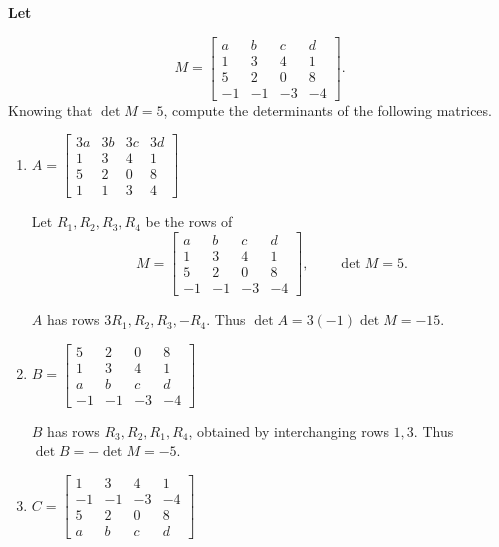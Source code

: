 \providecommand{\rank}{\operatorname{r}}
\providecommand{\RR}{\mathbb R}
\providecommand{\CC}{\mathbb C}
\providecommand{\KK}{\mathbb K}

\setcounter{enumi}{45}
\item {\bfseries\boldmath
Let
}

\[
M=\begin{bmatrix}a&b&c&d\\1&3&4&1\\5&2&0&8\\-1&-1&-3&-4\end{bmatrix}.
\]
Knowing that $\det M=5$, compute the determinants of the following matrices.

\begin{enumerate}[label=\alph*)]

\item $A=\begin{bmatrix}3a&3b&3c&3d\\1&3&4&1\\5&2&0&8\\1&1&3&4\end{bmatrix}$

\begin{answer}
Let $R_1,R_2,R_3,R_4$ be the rows of
\[
 M=\begin{bmatrix}a&b&c&d\\1&3&4&1\\5&2&0&8\\-1&-1&-3&-4\end{bmatrix},
 \qquad\det M=5.
\]

$A$ has rows $3R_1,R_2,R_3,-R_4$.
Thus $\det A=3(-1)\det M=-15$.
\end{answer}

\item $B=\begin{bmatrix}5&2&0&8\\1&3&4&1\\a&b&c&d\\-1&-1&-3&-4\end{bmatrix}$

\begin{answer}
$B$ has rows $R_3,R_2,R_1,R_4$, obtained by interchanging rows $1,3$.
Thus $\det B=-\det M=-5$.
\end{answer}

\item $C=\begin{bmatrix}1&3&4&1\\-1&-1&-3&-4\\5&2&0&8\\a&b&c&d\end{bmatrix}$


\end{enumerate}
